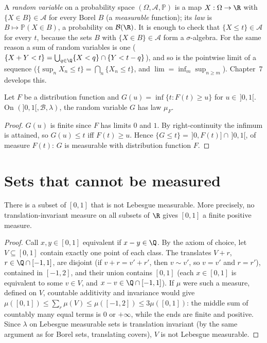 A \emph{random variable} on a probability space $(\Omega,\mathcal A,\mathbb P)$ is a map $X:\Omega\to\R$ with $\{X\in B\}\in\mathcal A$ for every Borel $B$ (a \emph{measurable} function); its \emph{law} is
$B\mapsto\mathbb P(X\in B)$, a probability on $\mathcal B(\R)$. It is enough to check that $\{X\le t\}\in\mathcal A$ for every $t$, because the sets $B$ with $\{X\in B\}\in\mathcal A$ form a $\sigma$-algebra.
For the same reason a sum of random variables is one ($\{X+Y<t\}=\bigcup_{q\in\Q}\{X<q\}\cap\{Y<t-q\}$), and so is the pointwise limit of a sequence ($\{\sup_nX_n\le t\}=\bigcap_n\{X_n\le t\}$, and
$\lim=\inf_m\sup_{n\ge m}$). Chapter~7 develops this.

\begin{proposition}\label{prop:quantile}
Let $F$ be a distribution function and $G(u)=\inf\{t:F(t)\ge u\}$ for $u\in\,]0,1[$. On $(]0,1[,\mathcal B,\lambda)$, the random variable $G$ has law $\mu_F$.
\end{proposition}
\begin{proof}
$G(u)$ is finite since $F$ has limits $0$ and $1$. By right-continuity the infimum is attained, so $G(u)\le t$ iff $F(t)\ge u$. Hence $\{G\le t\}=\,]0,F(t)]\cap\,]0,1[$, of measure $F(t)$: $G$ is
measurable with distribution function $F$.
\end{proof}

\section{Sets that cannot be measured}

\begin{theorem}[Vitali, 1905]\label{thm:vitali6}
There is a subset of $[0,1]$ that is not Lebesgue measurable. More precisely, no translation-invariant measure on all subsets of $\R$ gives $[0,1]$ a finite
positive measure.
\end{theorem}
\begin{proof}
Call $x,y\in[0,1]$ equivalent if $x-y\in\Q$. By the axiom of choice, let $V\subseteq[0,1]$ contain exactly one point of each class. The translates $V+r$, $r\in\Q\cap[-1,1]$, are
disjoint (if $v+r=v'+r'$, then $v\sim v'$, so $v=v'$ and $r=r'$), contained in $[-1,2]$, and their union contains $[0,1]$ (each $x\in[0,1]$ is equivalent to some $v\in V$, and
$x-v\in\Q\cap[-1,1]$). If $\mu$ were such a measure, defined on $V$, countable additivity and invariance would give $\mu([0,1])\le\sum_r\mu(V)\le\mu([-1,2])\le3\mu([0,1])$: the middle sum of
countably many equal terms is $0$ or $+\infty$, while the ends are finite and positive. Since $\lambda$ on Lebesgue measurable sets is translation invariant (by the
same argument as for Borel sets, translating covers), $V$ is not Lebesgue measurable.
\end{proof}

